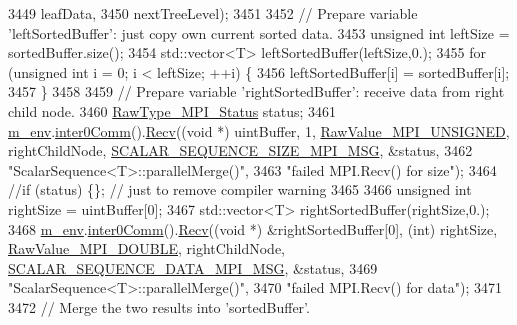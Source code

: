 \begin{DoxyCode}
3449                           leafData,
3450                           nextTreeLevel);
3451 
3452       \textcolor{comment}{// Prepare variable 'leftSortedBuffer': just copy own current sorted data.}
3453       \textcolor{keywordtype}{unsigned} \textcolor{keywordtype}{int} leftSize = sortedBuffer.size();
3454       std::vector<T> leftSortedBuffer(leftSize,0.);
3455       \textcolor{keywordflow}{for} (\textcolor{keywordtype}{unsigned} \textcolor{keywordtype}{int} i = 0; i < leftSize; ++i) \{
3456         leftSortedBuffer[i] = sortedBuffer[i];
3457       \}
3458 
3459       \textcolor{comment}{// Prepare variable 'rightSortedBuffer': receive data from right child node.}
3460       \hyperlink{namespace_q_u_e_s_o_af3c313103c6396188748a1d534577ff7}{RawType\_MPI\_Status} status;
3461       \hyperlink{class_q_u_e_s_o_1_1_scalar_sequence_a71618cd6351b29361b437af68447a4c8}{m\_env}.\hyperlink{class_q_u_e_s_o_1_1_base_environment_a689e4d140c74d495d97eb498714a4b82}{inter0Comm}().\hyperlink{class_q_u_e_s_o_1_1_mpi_comm_a12d7a87a4407e442c35a17d3caaf46c1}{Recv}((\textcolor{keywordtype}{void} *) uintBuffer, 1, 
      \hyperlink{_mpi_comm_8h_a06cbfbc33436f6e0dc8a48ff3c49bdfc}{RawValue\_MPI\_UNSIGNED}, rightChildNode, 
      \hyperlink{_scalar_sequence_8h_ab861df57b68ddbaa21de47a2955f1c86}{SCALAR\_SEQUENCE\_SIZE\_MPI\_MSG}, &status,
3462                               \textcolor{stringliteral}{"ScalarSequence<T>::parallelMerge()"},
3463                               \textcolor{stringliteral}{"failed MPI.Recv() for size"});
3464       \textcolor{comment}{//if (status) \{\}; // just to remove compiler warning}
3465 
3466       \textcolor{keywordtype}{unsigned} \textcolor{keywordtype}{int} rightSize = uintBuffer[0];
3467       std::vector<T> rightSortedBuffer(rightSize,0.);
3468       \hyperlink{class_q_u_e_s_o_1_1_scalar_sequence_a71618cd6351b29361b437af68447a4c8}{m\_env}.\hyperlink{class_q_u_e_s_o_1_1_base_environment_a689e4d140c74d495d97eb498714a4b82}{inter0Comm}().\hyperlink{class_q_u_e_s_o_1_1_mpi_comm_a12d7a87a4407e442c35a17d3caaf46c1}{Recv}((\textcolor{keywordtype}{void} *) &rightSortedBuffer[0], (\textcolor{keywordtype}{int}) rightSize, 
      \hyperlink{_mpi_comm_8h_ad0f503bd9fecfe4e570ca3d15aaf2518}{RawValue\_MPI\_DOUBLE}, rightChildNode, 
      \hyperlink{_scalar_sequence_8h_aeaa93ea37bc3de247daf0de5f9ae6bcd}{SCALAR\_SEQUENCE\_DATA\_MPI\_MSG}, &status,
3469                               \textcolor{stringliteral}{"ScalarSequence<T>::parallelMerge()"},
3470                               \textcolor{stringliteral}{"failed MPI.Recv() for data"});
3471 
3472       \textcolor{comment}{// Merge the two results into 'sortedBuffer'.}

\end{DoxyCode}
